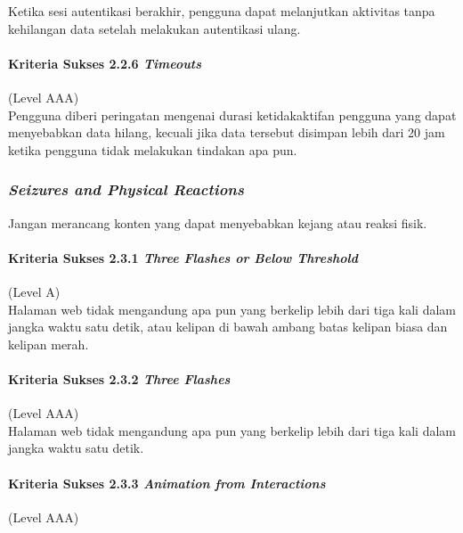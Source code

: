 Ketika sesi autentikasi berakhir, pengguna dapat melanjutkan aktivitas tanpa kehilangan data setelah melakukan autentikasi ulang.

\paragraph{Kriteria Sukses 2.2.6 \textit{Timeouts}}
\label{sec:kriteria_sukses_2.2.6}
(Level AAA)\\

Pengguna diberi peringatan mengenai durasi ketidakaktifan pengguna yang dapat menyebabkan data hilang, kecuali jika data tersebut disimpan lebih dari 20 jam ketika pengguna tidak melakukan tindakan apa pun.

\subsubsection{\textit{Seizures and Physical Reactions}}
\label{sec:seizures_and_physical_reactions}
Jangan merancang konten yang dapat menyebabkan kejang atau reaksi fisik.

\paragraph{Kriteria Sukses 2.3.1 \textit{Three Flashes or Below Threshold}}
\label{sec:kriteria_sukses_2.3.1}
(Level A)\\

Halaman web tidak mengandung apa pun yang berkelip lebih dari tiga kali dalam jangka waktu satu detik, atau kelipan di bawah ambang batas kelipan biasa dan kelipan merah.

\paragraph{Kriteria Sukses 2.3.2 \textit{Three Flashes}}
\label{sec:kriteria_sukses_2.3.2}
(Level AAA)\\

Halaman web tidak mengandung apa pun yang berkelip lebih dari tiga kali dalam jangka waktu satu detik.

\paragraph{Kriteria Sukses 2.3.3 \textit{Animation from Interactions}}
\label{sec:kriteria_sukses_2.3.3}
(Level AAA)\\


